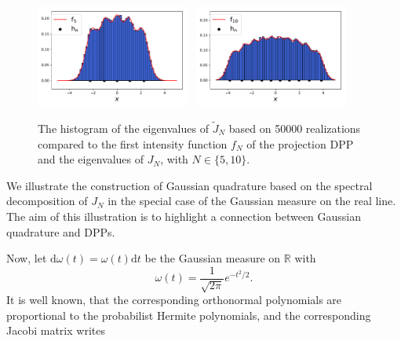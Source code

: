 \documentclass[twoside,11pt]{book}
\numberwithin{theorem}{chapter}
\numberwithin{definition}{chapter}
\numberwithin{proposition}{chapter}
\numberwithin{corollary}{chapter}
\numberwithin{example}{chapter}
\numberwithin{lemma}{chapter}
\numberwithin{assumption}{chapter}
\begin{document}
\begin{figure}[]
    \centering
\includegraphics[width= 0.45\textwidth]{img/neurips/Hermite/HermiteOP_kernel_diagonal_N_5_vs_50000_empirical}~
\includegraphics[width= 0.45\textwidth]{img/neurips/Hermite/HermiteOP_kernel_diagonal_N_10_vs_50000_empirical}
\caption{The histogram of the eigenvalues of $\tilde{J}_{N}$ based on 50000 realizations compared to the first intensity function $f_{N}$ of the projection DPP and the eigenvalues of $J_{N}$, with $N \in\{5,10\}$.   \label{fig:unidimHermiteEnsembleChristoffel}}
\end{figure}

We illustrate the construction of Gaussian quadrature based on the spectral decomposition of $J_N$ in the special case of the Gaussian measure on the real line. The aim of this illustration is to highlight a connection between Gaussian quadrature and DPPs.

Now, let $\mathrm{d}\omega(t) = \omega(t) \mathrm{d}t$ be the Gaussian measure on $\mathbb{R}$ with
\begin{equation}
\omega(t) = \frac{1}{\sqrt{2\pi}} e^{-t^{2}/2}.
\end{equation}
It is well known, that the corresponding orthonormal polynomials are proportional to the probabilist Hermite polynomials, and the corresponding Jacobi matrix writes
\end{document}
